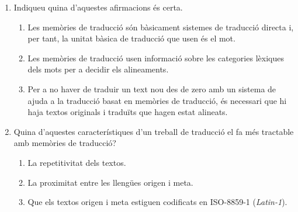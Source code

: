 \begin{enumerate}
\item Indiqueu quina d'aquestes afirmacions és certa. 
  \begin{enumerate}
  \item Les
    memòries de traducció són bàsicament sistemes de traducció directa
    i, per tant, la unitat bàsica de traducció que usen és el mot.
  \item Les memòries de traducció usen informació sobre les
    categories lèxiques dels mots per a decidir els alineaments.
  \item Per a no haver de traduir un text nou des de zero amb un
    sistema de ajuda a la traducció basat en memòries de traducció, és
    necessari que hi haja textos originals i traduïts que hagen estat
    alineats.
  \end{enumerate}

\item Quina d'aquestes característiques d'un treball de traducció el fa més tractable amb memòries de traducció? 
  \begin{enumerate}
  \item La repetitivitat dels textos.
  \item La proximitat entre les llengües origen i meta.
  \item Que els textos origen i meta estiguen codificats en ISO-8859-1 (\emph{Latin-1}).
  \end{enumerate}




\end{enumerate}

